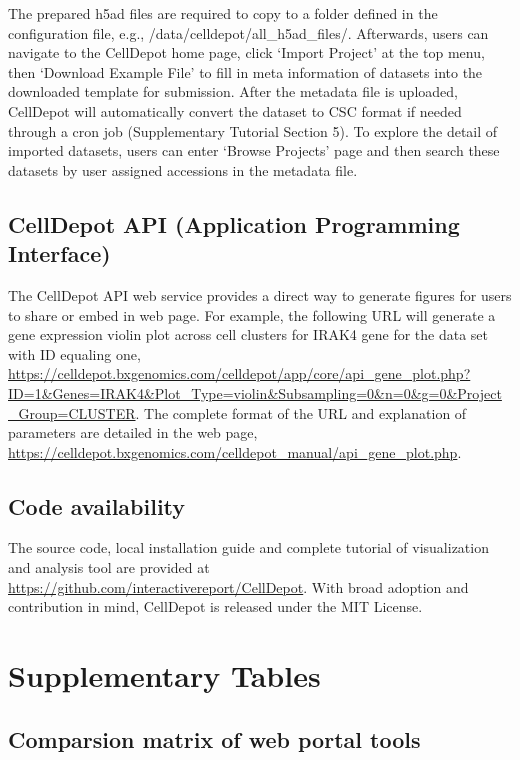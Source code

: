 \documentclass[
]{book}
\begin{document}
The prepared h5ad files are required to copy to a folder defined in the configuration file, e.g., /data/celldepot/all\_h5ad\_files/. Afterwards, users can navigate to the CellDepot home page, click `Import Project' at the top menu, then `Download Example File' to fill in meta information of datasets into the downloaded template for submission. After the metadata file is uploaded, CellDepot will automatically convert the dataset to CSC format if needed through a cron job (Supplementary Tutorial Section 5). To explore the detail of imported datasets, users can enter `Browse Projects' page and then search these datasets by user assigned accessions in the metadata file.

\hypertarget{celldepot-api-application-programming-interface}{%
\section{CellDepot API (Application Programming Interface)}\label{celldepot-api-application-programming-interface}}

The CellDepot API web service provides a direct way to generate figures for users to share or embed in web page. For example, the following URL will generate a gene expression violin plot across cell clusters for IRAK4 gene for the data set with ID equaling one, \url{https://celldepot.bxgenomics.com/celldepot/app/core/api_gene_plot.php?ID=1\&Genes=IRAK4\&Plot_Type=violin\&Subsampling=0\&n=0\&g=0\&Project_Group=CLUSTER}. The complete format of the URL and explanation of parameters are detailed in the web page, \url{https://celldepot.bxgenomics.com/celldepot_manual/api_gene_plot.php}.

\hypertarget{code-availability}{%
\section{Code availability}\label{code-availability}}

The source code, local installation guide and complete tutorial of visualization and analysis tool are provided at \url{https://github.com/interactivereport/CellDepot}. With broad adoption and contribution in mind, CellDepot is released under the MIT License.

\hypertarget{SITable}{%
\chapter{Supplementary Tables}\label{SITable}}

\hypertarget{comparsion-matrix-of-web-portal-tools}{%
\section{Comparsion matrix of web portal tools}\label{comparsion-matrix-of-web-portal-tools}}
\end{document}
